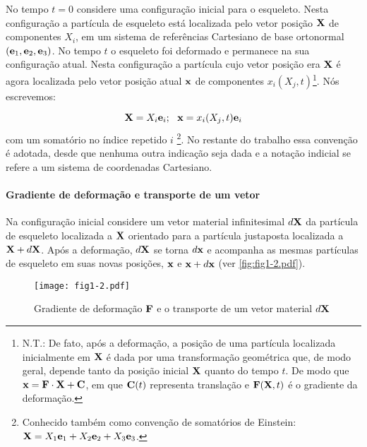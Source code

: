 \documentclass[
	11pt, %
	fleqn, %
	a4paper, %
]{LegrandOrangeBook}
\begin{document}
No tempo $t=0$ considere uma configuração inicial para o esqueleto. Nesta configuração a partícula de esqueleto está localizada pelo vetor posição $\textbf{X}$ de componentes $X_i$, em um sistema de referências Cartesiano de base ortonormal $(\textbf{e}_1, \textbf{e}_2, \textbf{e}_3)$. No tempo $t$ o esqueleto foi deformado e permanece na sua configuração atual. Nesta configuração a partícula cujo vetor posição era $\textbf{X}$ é agora localizada pelo vetor posição atual $\textbf{x}$ de componentes $x_i(X_j,t)$\footnote{N.T.: De fato, após a deformação, a posição de uma partícula localizada inicialmente em $\textbf{X}$ é dada por uma transformação geométrica que, de modo geral, depende tanto da posição inicial $\textbf{X}$ quanto do tempo $t$. De modo que $\textbf{x} = \textbf{F} \cdot \textbf{X} + \textbf{C}$, em que $\textbf{C}(t)$ representa translação e $\textbf{F}(\textbf{X},t)$ é o gradiente da deformação.}. Nós escrevemos:

\begin{equation}
		\label{eq:Xl_e_xl}	
		\textbf{X} = X_i \textbf{e}_i; ~~ \textbf{x} = x_i(X_j,t)\textbf{e}_i 
\end{equation} 
com um somatório no índice repetido $i$ \footnote{Conhecido também como convenção de somatórios de Einstein: $\textbf{X} = X_1 \textbf{e}_1 + X_2 \textbf{e}_2 + X_3 \textbf{e}_3$.}. No restante do trabalho essa convenção é adotada, desde que nenhuma outra indicação seja dada e a notação indicial se refere a um sistema de coordenadas Cartesiano.
\\
\paragraph{Gradiente de deformação e transporte de um vetor} Na configuração inicial considere um vetor material infinitesimal $d\textbf{X}$ da partícula de esqueleto localizada a $\textbf{X}$ orientado para a partícula justaposta localizada a $\textbf{X}+d\textbf{X}$. Após a deformação, $d\textbf{X}$ se torna $d\textbf{x}$ e acompanha as mesmas partículas de esqueleto em suas novas posições, $\textbf{x}$ e $\textbf{x}+d\textbf{x}$ (ver \autoref{fig:fig1-2.pdf}). 

\begin{figure}[H] %
	\centering %
	\texttt{[image: fig1-2.pdf]} %
	\caption{Gradiente de deformação $\textbf{F}$ e o transporte de um vetor material $d\textbf{X}$}
	\label{fig:fig1-2.pdf} %
\end{figure}
\end{document}
